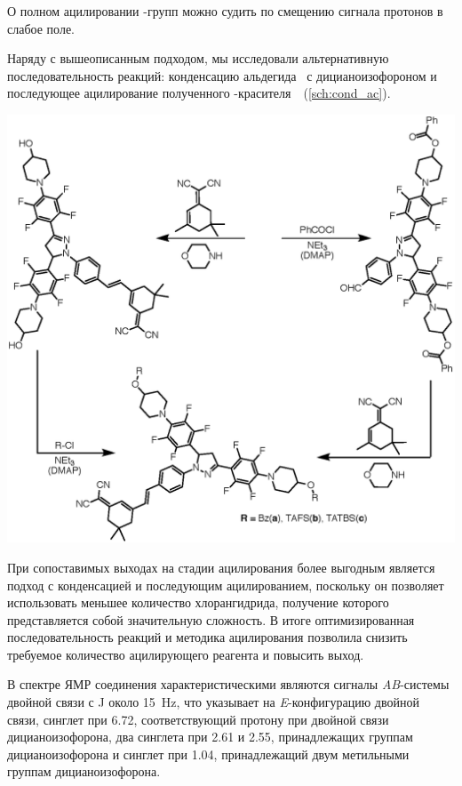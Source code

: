 О полном ацилировании -групп можно судить по смещению сигнала протонов  в слабое поле.

Наряду с вышеописанным подходом, мы исследовали альтернативную последовательность реакций: конденсацию альдегида~ с дицианоизофороном и последующее ацилирование полученного \mbox{-красителя}~~(\ref{sch:cond_ac}). 

\begin{scheme}[h!]
    \centering
    \includegraphics{sections/results/img/acylation.eps}
    \caption{}
    \label{sch:acylation}
\end{scheme}

При сопоставимых выходах на стадии ацилирования более выгодным является подход с конденсацией и последующим ацилированием, поскольку он позволяет использовать меньшее количество хлорангидрида, получение которого представляется собой значительную сложность. В итоге оптимизированная последовательность реакций и методика ацилирования позволила снизить требуемое количество ацилирующего реагента и повысить выход.

В спектре ЯМР  соединения  характеристическими являются сигналы \emph{AB}-системы двойной связи с \ac{J} около \SI{15}{\hertz}, что указывает на \emph{E}-конфигурацию двойной связи, синглет при \SI{6.72}{\ppm}, соответствующий протону при двойной связи дицианоизофорона, два синглета при 2.61 и \SI{2.55}{\ppm}, принадлежащих  группам дицианоизофорона и синглет при \SI{1.04}{\ppm}, принадлежащий двум метильными группам дицианоизофорона.

